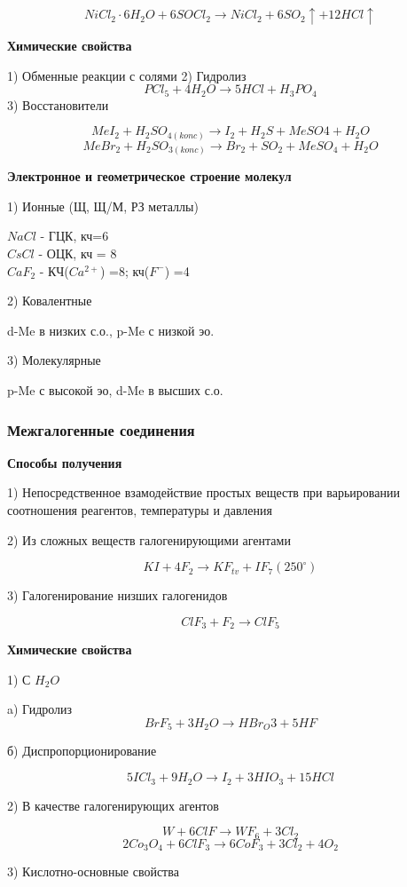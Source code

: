 $$NiCl_2\cdot6H_2O + 6SOCl_2 \rightarrow NiCl_2 + 6SO_2\uparrow + 12HCl\uparrow$$

\textbf{{Химические свойства}}

1) Обменные реакции с солями
2) Гидролиз
$$PCl_5 + 4H_2O \rightarrow 5HCl + H_3PO_4$$
3) Восстановители

$$MeI_2 + H_2SO_{4(konc)} \rightarrow I_2 + H_2S + MeSO4 + H_2O$$
$$MeBr_2 + H_2SO_{3(konc)} \rightarrow Br_2 + SO_2 + MeSO_4 + H_2O$$

\textbf{Электронное и геометрическое строение молекул}

1) Ионные (Щ, Щ/М, РЗ металлы)

$NaCl$ - ГЦК, кч=6\\
$CsCl$ - ОЦК, кч = 8\\
$CaF_2$ - КЧ($Ca^{2+}$) =8; кч($F^-$) =4

2) Ковалентные

d-Me в низких с.о., p-Me с низкой эо.

3) Молекулярные

p-Me с высокой эо, d-Me в высших с.о.

\subsubsection*{Межгалогенные соединения}

\textbf{Способы получения}

1) Непосредственное взамодействие простых веществ при варьировании соотношения реагентов, температуры и давления

2) Из сложных веществ галогенирующими агентами

$$KI + 4F_2 \rightarrow KF_{tv} + IF_7 (250^{\circ})$$

3) Галогенирование низших галогенидов

$$ClF_3 + F_2 \rightarrow ClF_5$$

\textbf{Химические свойства}

1) С $H_2O$

a) Гидролиз
$$BrF_5 + 3H_2O \rightarrow HBr_O3 + 5HF$$

б) Диспропорционирование

$$5ICl_3 + 9H_2O \rightarrow I_2 + 3HIO_3 + 15HCl$$

2) В качестве галогенирующих агентов

$$W + 6ClF \rightarrow WF_6 + 3Cl_2$$
$$2Co_3O_4 + 6ClF_3 \rightarrow 6CoF_3 + 3Cl_2 + 4O_2$$

3) Кислотно-основные свойства

